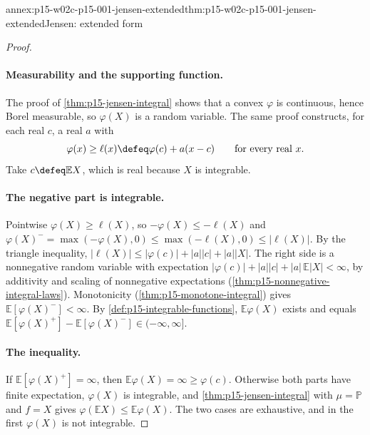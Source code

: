 \begin{annexitem}{annex:p15-w02c-p15-001-jensen-extended}{thm:p15-w02c-p15-001-jensen-extended}{Jensen: extended form}
\begin{proof}
\paragraph{Measurability and the supporting function.}
The proof of \cref{thm:p15-jensen-integral} shows that a convex
\(\varphi\) is continuous, hence Borel measurable, so \(\varphi(X)\) is a
random variable. The same proof constructs, for each real \(c\), a real
\(a\) with
\[
 \varphi(x)\geq\ell(x)\defeq\varphi(c)+a(x-c)\qquad\text{for every real }x.
\]
Take \(c\defeq\mathbb EX\), which is real because \(X\) is integrable.

\paragraph{The negative part is integrable.}
Pointwise \(\varphi(X)\geq\ell(X)\), so \(-\varphi(X)\leq-\ell(X)\) and
\(\varphi(X)^-=\max(-\varphi(X),0)\leq\max(-\ell(X),0)\leq|\ell(X)|\).
By the triangle inequality,
\(|\ell(X)|\leq|\varphi(c)|+|a||c|+|a||X|\). The right side is a
nonnegative random variable with expectation
\(|\varphi(c)|+|a||c|+|a|\,\mathbb E|X|<\infty\), by additivity and
scaling of nonnegative expectations
(\cref{thm:p15-nonnegative-integral-laws}). Monotonicity
(\cref{thm:p15-monotone-integral}) gives
\(\mathbb E[\varphi(X)^-]<\infty\). By
\cref{def:p15-integrable-functions}, \(\mathbb E\varphi(X)\) exists and
equals \(\mathbb E[\varphi(X)^+]-\mathbb E[\varphi(X)^-]\in(-\infty,\infty]\).

\paragraph{The inequality.}
If \(\mathbb E[\varphi(X)^+]=\infty\), then
\(\mathbb E\varphi(X)=\infty\geq\varphi(c)\). Otherwise both parts have
finite expectation, \(\varphi(X)\) is integrable, and
\cref{thm:p15-jensen-integral} with \(\mu=\mathbb P\) and \(f=X\) gives
\(\varphi(\mathbb EX)\leq\mathbb E\varphi(X)\). The two cases are
exhaustive, and in the first \(\varphi(X)\) is not integrable.
\end{proof}
\end{annexitem}

